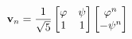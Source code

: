 \documentclass[preview]{standalone}
\begin{document}
\begin{align*}
\special{dvisvgm:raw <g id='unique000'>}\mathbf{v}_n = \frac{1}{\sqrt{5}}\begin{bmatrix} \varphi & \psi \\ 1 & 1 \end{bmatrix}\begin{bmatrix} \varphi^n \\ -\psi^n \end{bmatrix}\special{dvisvgm:raw </g>}
\end{align*}
\end{document}
